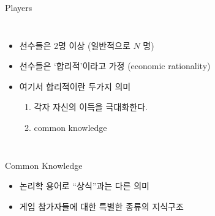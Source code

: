 \documentclass[final]{beamer}
\begin{document}
\begin{frame}[t]{Players}
	\begin{columns}[c]
		\begin{itemize}
			\item 선수들은 2명 이상 (일반적으로 $N$ 명)
			\item 선수들은 `합리적'이라고 가정 (economic rationality)
			\item 여기서 합리적이란 두가지 의미 
			\begin{enumerate}
				\item 각자 자신의 이득을 극대화한다. 
				\item common knowledge 
			\end{enumerate}
		\end{itemize}
	\end{columns}
\end{frame}

\begin{frame}[t]{Common Knowledge}
	\begin{itemize}
		\item 논리학 용어로 ``상식''과는 다른 의미
		\item 게임 참가자들에 대한 특별한 종류의 지식구조
	\end{itemize}
	\begin{center}
	\end{center}
\end{frame}
\end{document}
